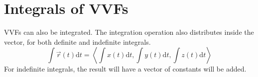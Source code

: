 \section{Integrals of VVFs}
VVFs can also be integrated. The integration operation also distributes inside the vector, for both definite and indefinite integrals.
\begin{equation*}
	\int{\vec{r}(t)\mathrm{d}t} = \left<\int{x(t)\mathrm{d}t},\int{y(t)\mathrm{d}t},\int{z(t)\mathrm{d}t}\right>
\end{equation*}
For indefinite integrals, the result will have a vector of constants will be added.